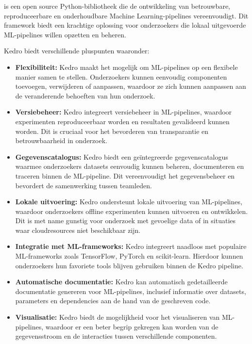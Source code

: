 \textcite{Kedro2024} is een open source Python-bibliotheek die de ontwikkeling van betrouwbare, reproduceerbare en onderhoudbare Machine Learning-pipelines vereenvoudigt. Dit framework biedt een krachtige oplossing voor onderzoekers die lokaal uitgevoerde ML-pipelines willen opzetten en beheren.

Kedro biedt verschillende pluspunten waaronder:

\begin{itemize}
    \item \textbf{Flexibiliteit:} Kedro maakt het mogelijk om ML-pipelines op een flexibele manier samen te stellen. Onderzoekers kunnen eenvoudig componenten toevoegen, verwijderen of aanpassen, waardoor ze zich kunnen aanpassen aan de veranderende behoeften van hun onderzoek.
    \item \textbf{Versiebeheer:} Kedro integreert versiebeheer in ML-pipelines, waardoor experimenten reproduceerbaar worden en resultaten gevalideerd kunnen worden. Dit is cruciaal voor het bevorderen van transparantie en betrouwbaarheid in onderzoek.
    \item \textbf{Gegevenscatalogus:} Kedro biedt een geïntegreerde gegevenscatalogus waarmee onderzoekers datasets eenvoudig kunnen beheren, documenteren en traceren binnen de ML-pipeline. Dit vereenvoudigt het gegevensbeheer en bevordert de samenwerking tussen teamleden.
    \item \textbf{Lokale uitvoering:} Kedro ondersteunt lokale uitvoering van ML-pipelines, waardoor onderzoekers offline experimenten kunnen uitvoeren en ontwikkelen. Dit is met name gunstig voor onderzoek met gevoelige data of in situaties waar cloudresources niet beschikbaar zijn.
    \item \textbf{Integratie met ML-frameworks:} Kedro integreert naadloos met populaire ML-frameworks zoals TensorFlow, PyTorch en scikit-learn. Hierdoor kunnen onderzoekers hun favoriete tools blijven gebruiken binnen de Kedro pipeline.
    \item \textbf{Automatische documentatie:} Kedro kan automatisch gedetailleerde documentatie genereren voor ML-pipelines, inclusief informatie over datasets, parameters en dependencies aan de hand van de geschreven code.
    \item \textbf{Visualisatie:} Kedro biedt de mogelijkheid voor het visualiseren van ML-pipelines, waardoor er een beter begrip gekregen kan worden van de gegevensstroom en de interacties tussen verschillende componenten.
\end{itemize}


